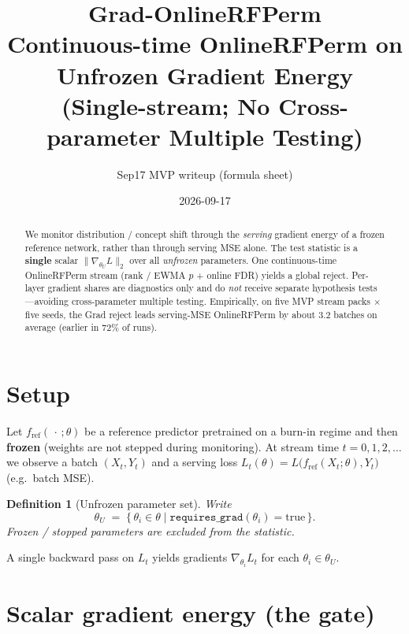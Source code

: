 \documentclass[11pt]{article}
\title{\textbf{Grad-OnlineRFPerm}\\
\large Continuous-time OnlineRFPerm on Unfrozen Gradient Energy\\
\large (Single-stream; No Cross-parameter Multiple Testing)}
\author{Sep17 MVP writeup (formula sheet)}
\date{2026-09-17}
\newtheorem{definition}{Definition}
\begin{document}
\maketitle

\begin{abstract}
We monitor distribution / concept shift through the \emph{serving}
gradient energy of a frozen reference network, rather than through
serving MSE alone. The test statistic is a \textbf{single} scalar
$\| \nabla_{\theta_U} L \|_2$ over all \emph{unfrozen} parameters.
One continuous-time OnlineRFPerm stream (rank / EWMA $p$ + online FDR)
yields a global reject. Per-layer gradient shares are diagnostics only
and do \emph{not} receive separate hypothesis tests---avoiding
cross-parameter multiple testing. Empirically, on five MVP stream packs
$\times$ five seeds, the Grad reject leads serving-MSE OnlineRFPerm by
about $3.2$ batches on average (earlier in $72\%$ of runs).
\end{abstract}

\tableofcontents
\vspace{1em}

\section{Setup}
\label{sec:setup}

Let $f_{\mathrm{ref}}(\,\cdot\,;\theta)$ be a reference predictor
pretrained on a burn-in regime and then \textbf{frozen}
(weights are not stepped during monitoring).
At stream time $t=0,1,2,\ldots$ we observe a batch
$(X_t,Y_t)$ and a serving loss $L_t(\theta)=L\bigl(f_{\mathrm{ref}}(X_t;\theta),Y_t\bigr)$
(e.g.\ batch MSE).

\begin{definition}[Unfrozen parameter set]
Write
\begin{equation}
  \theta_U
  \;=\;
  \bigl\{\,
    \theta_i \in \theta
    \;\big|\;
    \texttt{requires\_grad}(\theta_i)=\mathrm{true}
  \,\bigr\}.
\end{equation}
Frozen / stopped parameters are excluded from the statistic.
\end{definition}

A single backward pass on $L_t$ yields gradients
$\nabla_{\theta_i} L_t$ for each $\theta_i\in\theta_U$.

\section{Scalar gradient energy (the gate)}
\label{sec:scalar}
\end{document}
